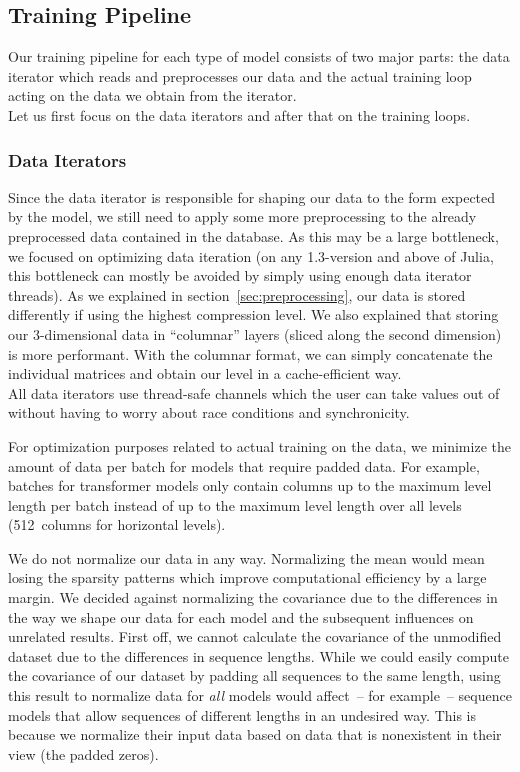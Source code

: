 \subsection{Training Pipeline}
\label{sec:training-pipeline}

Our training pipeline for each type of model consists of two major
parts: the data iterator which reads and preprocesses our data and the
actual training loop acting on the data we obtain from the iterator. \\
Let us first focus on the data iterators and after that on the
training loops.

\subsubsection{Data Iterators}

Since the data iterator is responsible for shaping our data to the
form expected by the model, we still need to apply some more
preprocessing to the already preprocessed data contained in the
database. As this may be a large bottleneck, we focused on optimizing
data iteration (on any 1.3-version and above of Julia, this bottleneck
can mostly be avoided by simply using enough data iterator threads).
As we explained in section~\ref{sec:preprocessing}, our data is stored
differently if using the highest compression level. We also explained
that storing our 3-dimensional data in ``columnar'' layers (sliced
along the second dimension) is more performant. With the columnar
format, we can simply concatenate the individual matrices and obtain
our level in a cache-efficient way. \\
All data iterators use thread-safe channels which the user can take
values out of without having to worry about race conditions and
synchronicity.

For optimization purposes related to actual training on the data, we
minimize the amount of data per batch for models that require padded
data. For example, batches for transformer models only contain columns
up to the maximum level length per batch instead of up to the maximum
level length over all levels (512~columns for horizontal levels).

We do not normalize our data in any way. Normalizing the mean would
mean losing the sparsity patterns which improve computational
efficiency by a large margin. We decided against normalizing the
covariance due to the differences in the way we shape our data for
each model and the subsequent influences on unrelated results. First
off, we cannot calculate the covariance of the unmodified dataset due
to the differences in sequence lengths. While we could easily compute
the covariance of our dataset by padding all sequences to the same
length, using this result to normalize data for \emph{all} models
would affect~-- for example~-- sequence models that allow sequences of
different lengths in an undesired way. This is because we normalize
their input data based on data that is nonexistent in their view (the
padded zeros).

